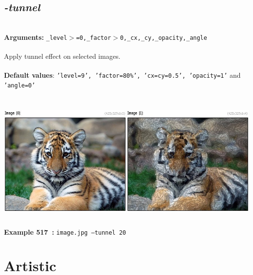 \documentclass[a4paper,11pt,twoside]{book}
\begin{document}
\subsection{\emph{-tunnel} }\vspace*{-0.5em}
~\\\textbf{Arguments: } 
{\small \texttt{\_level$>$=0,\_factor$>$0,\_cx,\_cy,\_opacity,\_angle}}\\~\\
Apply tunnel effect on selected images.
~\\~\\\textbf{Default values}: {\small \texttt{'level=9', 'factor=80\%', 'cx=cy=0.5', 'opacity=1'} and \texttt{'angle=0'}}
\begin{center}\includegraphics[keepaspectratio=true,height=7cm,width=\textwidth]{img/gmic_def517.jpg}\\
{\footnotesize \textbf{Example 517~:} \texttt{image.jpg --tunnel 20}}
\end{center}
\section{Artistic}
\end{document}
